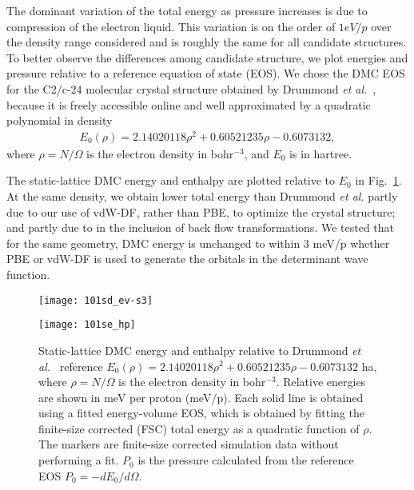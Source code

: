 The dominant variation of the total energy as pressure increases is due to compression of the electron liquid. This variation is on the order of $1 eV/p$ over the density range considered and is roughly the same for all candidate structures.
To better observe the differences among candidate structure, we plot energies and pressure relative to a reference equation of state (EOS).
We chose the DMC EOS for the C2/c-24 molecular crystal structure obtained by Drummond \textit{et al.}~\cite{Drummond2015}, because it is freely accessible online and well approximated by a quadratic polynomial in density
\begin{align}
E_0(\rho) = 2.14020118\rho^2 + 0.60521235\rho - 0.6073132,
\end{align}
where $\rho=N/\Omega$ is the electron density in bohr$^{-3}$, and $E_0$ is in hartree.

The static-lattice DMC energy and enthalpy are plotted relative to $E_0$ in Fig.~\ref{fig:static-qmc-vs-drummond}. At the same density, we obtain lower total energy than Drummond \textit{et al.} partly due to our use of vdW-DF, rather than  PBE, to optimize the crystal structure; and partly due to in the inclusion of back flow transformations. We tested that for the same geometry, DMC energy is unchanged to within 3 meV/p whether PBE or vdW-DF is used to generate the orbitals in the determinant wave function.

\begin{figure}[h]
\begin{minipage}{0.49\textwidth}
\texttt{[image: 101sd\_ev-s3]}
\end{minipage}
\begin{minipage}{0.49\textwidth}
\texttt{[image: 101se\_hp]}
\end{minipage}
\caption{Static-lattice DMC energy and enthalpy relative to Drummond \textit{et al.}~\cite{Drummond2015} reference $E_0(\rho) = 2.14020118\rho^2 + 0.60521235\rho - 0.6073132$ ha, where $\rho=N/\Omega$ is the electron density in bohr$^{-3}$. Relative energies are shown in meV per proton (meV/p). Each solid line is obtained using a fitted energy-volume EOS, which is obtained by fitting the finite-size corrected (FSC) total energy as a quadratic function of $\rho$. The markers are finite-size corrected simulation data without performing a fit. $P_0$ is the pressure calculated from the reference EOS $P_0=-dE_0/d\Omega$. \label{fig:static-qmc-vs-drummond}}
\end{figure}

